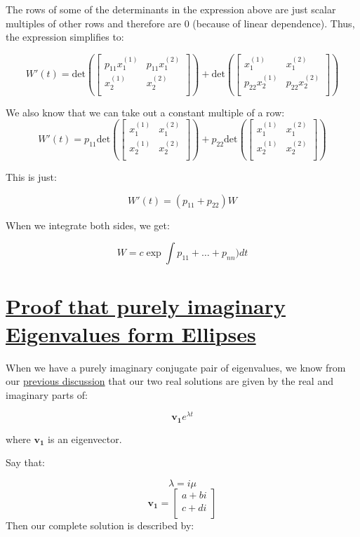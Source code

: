 \documentclass{report}
\begin{document}
{The rows of some of the determinants in the expression above are just scalar multiples of other rows and therefore are 0 (because of linear dependence). Thus, the expression simplifies to:

$$
W'(t) =
\text{det}\left(
\begin{bmatrix}
    p_{11}x_1^{(1)} & p_{11}x_1^{(2)} \\
    x_2^{(1)} & x_2^{(2)} \\
\end{bmatrix}\right)
+
\text{det}\left(
\begin{bmatrix}
    x_1^{(1)} & x_1^{(2)} \\
    p_{22}x_2^{(1)} &  p_{22}x_2^{(2)} \\
\end{bmatrix}\right)
$$

We also know that we can take out a constant multiple of a row:
$$
W'(t) =
p_{11}
\text{det}\left(
\begin{bmatrix}
    x_1^{(1)} & x_1^{(2)} \\
    x_2^{(1)} & x_2^{(2)} \\
\end{bmatrix}\right)
+
p_{22}
\text{det}\left(
\begin{bmatrix}
    x_1^{(1)} & x_1^{(2)} \\
    x_2^{(1)} &  x_2^{(2)} \\
\end{bmatrix}\right)
$$

This is just:

$$W'(t) = (p_{11} + p_{22})W$$

When we integrate both sides, we get:

$$W = c\exp{\int{p_{11} + \dots + p_{nn})dt}}$$


\section{\hyperref[sec:center]{Proof that purely imaginary Eigenvalues form Ellipses}}
\label{sec:prCenter}

When we have a purely imaginary conjugate pair of eigenvalues, we know from our \hyperref[th:compEigenvals]{previous discussion} that our two real solutions are given by the real and imaginary parts of:

$$\mathbf{v_1}e^{\lambda t}$$

where $\mathbf{v_1}$ is an eigenvector.

Say that:

$$\lambda = i\mu$$
$$\mathbf{v_1}
= \begin{bmatrix}
    a + bi \\
    c + di \\
\end{bmatrix}$$
Then our complete solution is described by:

}
\end{document}
